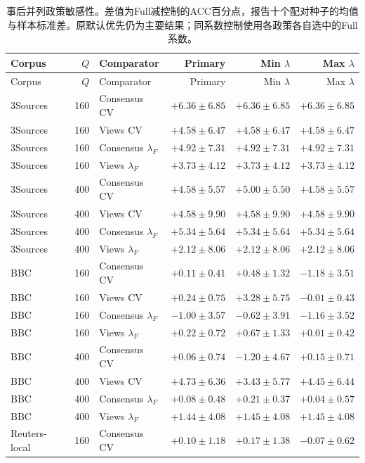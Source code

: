 \begingroup\small
\begin{longtable}{lrlrrr}
\caption{事后并列政策敏感性。差值为Full减控制的ACC百分点，报告十个配对种子的均值与样本标准差。原默认优先仍为主要结果；同系数控制使用各政策各自选中的Full系数。}\label{tab:allocation-tie-sensitivity}\\
\toprule
Corpus & $Q$ & Comparator & Primary & Min $\lambda$ & Max $\lambda$\\
\midrule\endfirsthead
\toprule
Corpus & $Q$ & Comparator & Primary & Min $\lambda$ & Max $\lambda$\\
\midrule\endhead
\bottomrule\endfoot
3Sources & 160 & Consensus CV & $+6.36\pm6.85$ & $+6.36\pm6.85$ & $+6.36\pm6.85$\\
3Sources & 160 & Views CV & $+4.58\pm6.47$ & $+4.58\pm6.47$ & $+4.58\pm6.47$\\
3Sources & 160 & Consensus $\lambda_F$ & $+4.92\pm7.31$ & $+4.92\pm7.31$ & $+4.92\pm7.31$\\
3Sources & 160 & Views $\lambda_F$ & $+3.73\pm4.12$ & $+3.73\pm4.12$ & $+3.73\pm4.12$\\
3Sources & 400 & Consensus CV & $+4.58\pm5.57$ & $+5.00\pm5.50$ & $+4.58\pm5.57$\\
3Sources & 400 & Views CV & $+4.58\pm9.90$ & $+4.58\pm9.90$ & $+4.58\pm9.90$\\
3Sources & 400 & Consensus $\lambda_F$ & $+5.34\pm5.64$ & $+5.34\pm5.64$ & $+5.34\pm5.64$\\
3Sources & 400 & Views $\lambda_F$ & $+2.12\pm8.06$ & $+2.12\pm8.06$ & $+2.12\pm8.06$\\
BBC & 160 & Consensus CV & $+0.11\pm0.41$ & $+0.48\pm1.32$ & $-1.18\pm3.51$\\
BBC & 160 & Views CV & $+0.24\pm0.75$ & $+3.28\pm5.75$ & $-0.01\pm0.43$\\
BBC & 160 & Consensus $\lambda_F$ & $-1.00\pm3.57$ & $-0.62\pm3.91$ & $-1.16\pm3.52$\\
BBC & 160 & Views $\lambda_F$ & $+0.22\pm0.72$ & $+0.67\pm1.33$ & $+0.01\pm0.42$\\
BBC & 400 & Consensus CV & $+0.06\pm0.74$ & $-1.20\pm4.67$ & $+0.15\pm0.71$\\
BBC & 400 & Views CV & $+4.73\pm6.36$ & $+3.43\pm5.77$ & $+4.45\pm6.44$\\
BBC & 400 & Consensus $\lambda_F$ & $+0.08\pm0.48$ & $+0.21\pm0.37$ & $+0.04\pm0.57$\\
BBC & 400 & Views $\lambda_F$ & $+1.44\pm4.08$ & $+1.45\pm4.08$ & $+1.45\pm4.08$\\
Reuters-local & 160 & Consensus CV & $+0.10\pm1.18$ & $+0.17\pm1.38$ & $-0.07\pm0.62$\\

\end{longtable}
